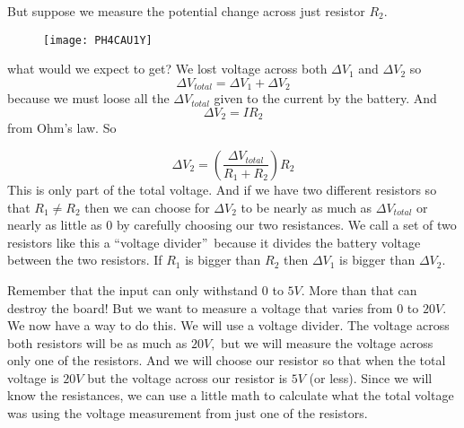 But suppose we measure the potential change across just resistor $R_{2}.$ 
\begin{figure}[h!]
\texttt{[image: PH4CAU1Y]}
\end{figure}what would we expect to get? We
lost voltage across both $\Delta V_{1}$ and $\Delta V_{2}$ so 
\begin{equation*}
\Delta V_{total}=\Delta V_{1}+\Delta V_{2}
\end{equation*}%
because we must loose all the $\Delta V_{total}$ given to the current by the
battery. And 
\begin{equation*}
\Delta V_{2}=IR_{2}
\end{equation*}%
from Ohm's law. So

\begin{equation*}
\Delta V_{2}=\left( \frac{\Delta V_{total}}{R_{1}+R_{2}}\right) R_{2}
\end{equation*}%
This is only part of the total voltage. And if we have two different
resistors so that $R_{1}\neq R_{2}$ then we can choose for $\Delta V_{2}$ to
be nearly as much as $\Delta V_{total}$ or nearly as little as $0$ by
carefully choosing our two resistances. We call a set of two resistors like
this a \textquotedblleft voltage divider\textquotedblright\ because it
divides the battery voltage between the two resistors. If $R_{1}$ is bigger
than $R_{2}$ then $\Delta V_{1}$ is bigger than $\Delta V_{2}.$

Remember that the input can only withstand $0$ to $5\unit{V}.$ More than
that can destroy the board! But we want to measure a voltage that varies
from $0$ to $20\unit{V}.$ We now have a way to do this. We will use a
voltage divider. The voltage across both resistors will be as much as $20%
\unit{V},$ but we will measure the voltage across only one of the resistors.
And we will choose our resistor so that when the total voltage is $20\unit{V}
$ but the voltage across our resistor is $5\unit{V}$ (or less). Since we
will know the resistances, we can use a little math to calculate what the
total voltage was using the voltage measurement from just one of the
resistors.

